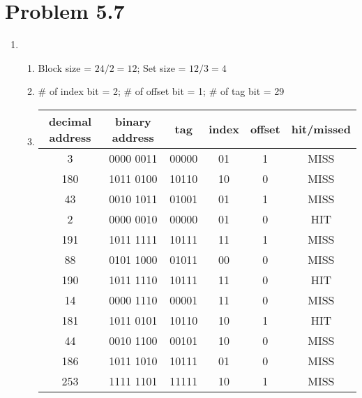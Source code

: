 \documentclass{article}
\def\math#1{$#1$}
\begin{document}
\section{Problem 5.7}
\begin{enumerate}[1)]
    \item 
        \begin{enumerate}
            \item  Block size = \math{24 / 2 = 12}; Set size = \math{12 / 3 = 4}
            \item \# of index bit = 2; \# of offset bit = 1; \# of tag bit = 29
            \item 
                \begin{center}
                    \begin{tabular}{ |c|c|c|c|c|c| }
                     \hline
                     decimal address & binary address & tag & index & offset & hit/missed \\
                     \hline
                     3 & 0000 0011 & 00000 & 01 & 1 & MISS \\  
                     \hline
                     180 & 1011 0100 & 10110 & 10 & 0 & MISS \\
                     \hline
                     43 & 0010 1011 & 01001 & 01 & 1 & MISS \\
                     \hline
                     2 & 0000 0010 & 00000 & 01 & 0 & HIT \\
                     \hline
                     191 & 1011 1111 & 10111 & 11 & 1 & MISS\\
                     \hline
                     88 & 0101 1000 & 01011 & 00 & 0 & MISS \\
                     \hline
                     190 & 1011 1110 & 10111 & 11 & 0 & HIT \\
                     \hline
                     14 & 0000 1110 & 00001 & 11 & 0 & MISS \\
                     \hline
                     181 & 1011 0101 & 10110 & 10 & 1 & HIT \\
                     \hline
                     44 & 0010 1100 & 00101 & 10 & 0 & MISS \\
                     \hline
                     186 & 1011 1010 & 10111 & 01 & 0 & MISS \\
                     \hline
                     253 & 1111 1101 & 11111 & 10 & 1 & MISS \\
                     \hline
                    \end{tabular}

\end{center}
\end{enumerate}
\end{enumerate}
\end{document}
